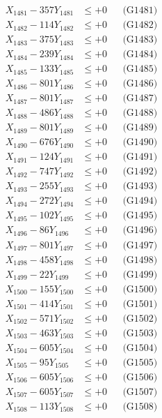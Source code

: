 \documentclass[a4paper,10pt]{article}
\begin{document}
{\begin{align}
\allowbreak
X_{1481} - 357Y_{1481} &\leq +0 && \text{(G1481)} \\
X_{1482} - 114Y_{1482} &\leq +0 && \text{(G1482)} \\
X_{1483} - 375Y_{1483} &\leq +0 && \text{(G1483)} \\
X_{1484} - 239Y_{1484} &\leq +0 && \text{(G1484)} \\
X_{1485} - 133Y_{1485} &\leq +0 && \text{(G1485)} \\
X_{1486} - 801Y_{1486} &\leq +0 && \text{(G1486)} \\
X_{1487} - 801Y_{1487} &\leq +0 && \text{(G1487)} \\
X_{1488} - 486Y_{1488} &\leq +0 && \text{(G1488)} \\
X_{1489} - 801Y_{1489} &\leq +0 && \text{(G1489)} \\
X_{1490} - 676Y_{1490} &\leq +0 && \text{(G1490)} \\
\allowbreak
X_{1491} - 124Y_{1491} &\leq +0 && \text{(G1491)} \\
X_{1492} - 747Y_{1492} &\leq +0 && \text{(G1492)} \\
X_{1493} - 255Y_{1493} &\leq +0 && \text{(G1493)} \\
X_{1494} - 272Y_{1494} &\leq +0 && \text{(G1494)} \\
X_{1495} - 102Y_{1495} &\leq +0 && \text{(G1495)} \\
X_{1496} - 86Y_{1496} &\leq +0 && \text{(G1496)} \\
X_{1497} - 801Y_{1497} &\leq +0 && \text{(G1497)} \\
X_{1498} - 458Y_{1498} &\leq +0 && \text{(G1498)} \\
X_{1499} - 22Y_{1499} &\leq +0 && \text{(G1499)} \\
X_{1500} - 155Y_{1500} &\leq +0 && \text{(G1500)} \\
\allowbreak
X_{1501} - 414Y_{1501} &\leq +0 && \text{(G1501)} \\
X_{1502} - 571Y_{1502} &\leq +0 && \text{(G1502)} \\
X_{1503} - 463Y_{1503} &\leq +0 && \text{(G1503)} \\
X_{1504} - 605Y_{1504} &\leq +0 && \text{(G1504)} \\
X_{1505} - 95Y_{1505} &\leq +0 && \text{(G1505)} \\
X_{1506} - 605Y_{1506} &\leq +0 && \text{(G1506)} \\
X_{1507} - 605Y_{1507} &\leq +0 && \text{(G1507)} \\
X_{1508} - 113Y_{1508} &\leq +0 && \text{(G1508)} \\

\end{align}}
\end{document}
